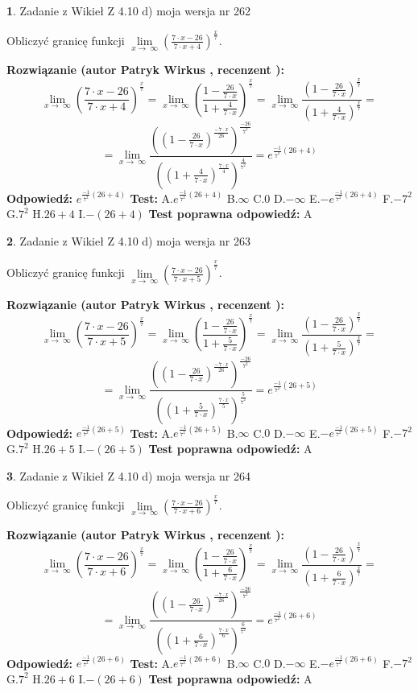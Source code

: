 \documentclass[12pt, a4paper]{article}
\theoremstyle{definition} %
\newtheorem{zad}{}
\newcommand{\zadStart}[1]{\begin{zad}#1\newline}
\newcommand{\zadStop}{\end{zad}}
\newcommand{\rozwStart}[2]{\noindent \textbf{Rozwiązanie (autor #1 , recenzent #2): }\newline}
\newcommand{\rozwStop}{\newline}
\newcommand{\odpStart}{\noindent \textbf{Odpowiedź:}\newline}
\newcommand{\odpStop}{\newline}
\newcommand{\testStart}{\noindent \textbf{Test:}\newline}
\newcommand{\testStop}{\newline}
\newcommand{\kluczStart}{\noindent \textbf{Test poprawna odpowiedź:}\newline}
\newcommand{\kluczStop}{\newline}
\begin{document}
\zadStart{Zadanie z Wikieł Z 4.10 d) moja wersja nr 262}


Obliczyć granicę funkcji  $\lim\limits_{x\to\ \infty}(\frac{7\cdot x-26}{7\cdot x+4})^{\frac{x}{7}}$.
\zadStop
\rozwStart{Patryk Wirkus}{}
$$\lim\limits_{x\to\ \infty}(\frac{7\cdot x-26}{7\cdot x+4})^{\frac{x}{7}} = \lim\limits_{x\to\ \infty}(\frac{1-\frac{26}{7\cdot x}}{1+\frac{4}{7\cdot x}})^{\frac{x}{7}}=\lim\limits_{x\to\ \infty}\frac{(1-\frac{26}{7\cdot x})^{\frac{x}{7}}}{(1+\frac{4}{7\cdot x})^{\frac{x}{7}}}=$$
$$=\lim\limits_{x\to\ \infty}\frac{((1-\frac{26}{7\cdot x})^{\frac{-7\cdot x}{26}})^{\frac{-26}{7^{2}}}}{((1+\frac{4}{7\cdot x})^{\frac{7\cdot x}{4}})^{\frac{4}{7^{2}}}}=e^{\frac{-1}{7^{2}}(26+4)}$$
\rozwStop
\odpStart
$e^{\frac{-1}{7^{2}}(26+4)}$
\odpStop
\testStart
A.$e^{\frac{-1}{7^{2}}(26+4)}$ B.$\infty$ C.$0$ D.$-\infty$ E.$-e^{\frac{-1}{7^{2}}(26+4)}$
F.$-7^{2}$ G.$7^{2}$
H.$26+4$
I.$-(26+4)$
\testStop
\kluczStart
A
\kluczStop



\zadStart{Zadanie z Wikieł Z 4.10 d) moja wersja nr 263}


Obliczyć granicę funkcji  $\lim\limits_{x\to\ \infty}(\frac{7\cdot x-26}{7\cdot x+5})^{\frac{x}{7}}$.
\zadStop
\rozwStart{Patryk Wirkus}{}
$$\lim\limits_{x\to\ \infty}(\frac{7\cdot x-26}{7\cdot x+5})^{\frac{x}{7}} = \lim\limits_{x\to\ \infty}(\frac{1-\frac{26}{7\cdot x}}{1+\frac{5}{7\cdot x}})^{\frac{x}{7}}=\lim\limits_{x\to\ \infty}\frac{(1-\frac{26}{7\cdot x})^{\frac{x}{7}}}{(1+\frac{5}{7\cdot x})^{\frac{x}{7}}}=$$
$$=\lim\limits_{x\to\ \infty}\frac{((1-\frac{26}{7\cdot x})^{\frac{-7\cdot x}{26}})^{\frac{-26}{7^{2}}}}{((1+\frac{5}{7\cdot x})^{\frac{7\cdot x}{5}})^{\frac{5}{7^{2}}}}=e^{\frac{-1}{7^{2}}(26+5)}$$
\rozwStop
\odpStart
$e^{\frac{-1}{7^{2}}(26+5)}$
\odpStop
\testStart
A.$e^{\frac{-1}{7^{2}}(26+5)}$ B.$\infty$ C.$0$ D.$-\infty$ E.$-e^{\frac{-1}{7^{2}}(26+5)}$
F.$-7^{2}$ G.$7^{2}$
H.$26+5$
I.$-(26+5)$
\testStop
\kluczStart
A
\kluczStop



\zadStart{Zadanie z Wikieł Z 4.10 d) moja wersja nr 264}


Obliczyć granicę funkcji  $\lim\limits_{x\to\ \infty}(\frac{7\cdot x-26}{7\cdot x+6})^{\frac{x}{7}}$.
\zadStop
\rozwStart{Patryk Wirkus}{}
$$\lim\limits_{x\to\ \infty}(\frac{7\cdot x-26}{7\cdot x+6})^{\frac{x}{7}} = \lim\limits_{x\to\ \infty}(\frac{1-\frac{26}{7\cdot x}}{1+\frac{6}{7\cdot x}})^{\frac{x}{7}}=\lim\limits_{x\to\ \infty}\frac{(1-\frac{26}{7\cdot x})^{\frac{x}{7}}}{(1+\frac{6}{7\cdot x})^{\frac{x}{7}}}=$$
$$=\lim\limits_{x\to\ \infty}\frac{((1-\frac{26}{7\cdot x})^{\frac{-7\cdot x}{26}})^{\frac{-26}{7^{2}}}}{((1+\frac{6}{7\cdot x})^{\frac{7\cdot x}{6}})^{\frac{6}{7^{2}}}}=e^{\frac{-1}{7^{2}}(26+6)}$$
\rozwStop
\odpStart
$e^{\frac{-1}{7^{2}}(26+6)}$
\odpStop
\testStart
A.$e^{\frac{-1}{7^{2}}(26+6)}$ B.$\infty$ C.$0$ D.$-\infty$ E.$-e^{\frac{-1}{7^{2}}(26+6)}$
F.$-7^{2}$ G.$7^{2}$
H.$26+6$
I.$-(26+6)$
\testStop
\kluczStart
A
\kluczStop
\end{document}

